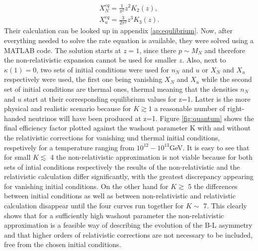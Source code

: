 \begin{align}
	X_N^{eq}=\frac{1}{\pi^2}z^2K_2(z),\\
	X_u^{eq}=\frac{3}{2\pi^2}z^3K_3(z).
\end{align}
Their calculation can be looked up in appendix \ref{ap:equlibrium}.\newline \indent
Now, after everything needed to solve the rate equation is available, they were solved using a MATLAB code. The solution starts at $z=1$, since there $p\sim M_N$ and therefore the non-relativistic expansion cannot be used for smaller $z$\cite[p. 13]{Bodeker:2013qaa}. Also, next to $\kappa(1)=0$, two sets of initial conditions were used for $n_N$ and $u$ or $X_N$ and $X_u$ respectively were used, the first one being vanishing $X_N$ and $X_u$ while the second set of initial conditions are thermal ones, thermal meaning that the densities $n_N$ and $u$ start at their corresponding equilibrium values for z=1. Latter is the more physical and realistic scenario because for $K\gtrsim1$ a reasonable number of right-handed neutrinos will have been produced at z=1\cite[p. 13]{Bodeker:2013qaa}. \newline\indent
Figure \ref{fig:quantum} shows the final efficiency factor plotted against the washout parameter K with and without the relativistic corrections for vanishing und thermal initial conditions, respetively for a temperature ranging from $10^{12}-10^{13}$GeV. It is easy to see that for small $K\lesssim$ 4 the non-relativistic approximation is not viable because for both sets of intial conditions respectively the results of the non-relativistic and the relativistic calculation differ significantly, with the greatest discrepancy appearing for vanishing initial conditions. On the other hand for $K\gtrsim$ 5 the differences between initial conditions as well as between non-relativistic and relativistic calculation disappear until the four curves run together for $K\sim$ 7. This clearly shows that for a sufficiently high washout parameter the non-relativistic approximation is a feasible way of describing the evolution of the B-L asymmetry and that higher orders of relativistic corrections are not necessary to be included, free from the chosen initial conditions.

